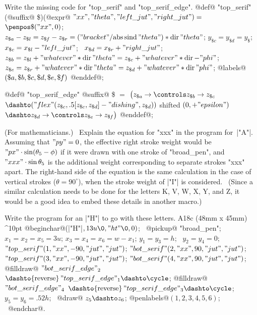 {{{{\ddangerexercise Write the missing code for "top\_serif" and
"top\_serif\_edge".
\answer @def@ "top\_serif"(@suffix@ \$)(@expr@ $"xx","theta",
 "left\_jut","right\_jut")=$\parbreak
\quad $\penpos\$("xx",0)$; \
$z_{\$a}-z_{\$l}=z_{\$\mkern-1muf}-z_{\$r}=
 ("bracket"/{\rm abs\,sind\,}"theta")\ast{\rm dir}\,"theta"$;\parbreak
\quad $y_{\$c}=y_{\$d}=y_\$$; \
 $x_{\$c}=x_{\$l}-"left\_jut"$; \ $x_{\$d}=x_{\$r}+"right\_jut"$;\parbreak
\quad $z_{\$b}=z_{\$l}+"whatever"\ast{\rm dir}\,"theta"
 =z_{\$c}+"whatever"\ast{\rm dir}\,{-"phi"}$;\parbreak
\quad $z_{\$e}=z_{\$r}+"whatever"\ast{\rm dir}\,"theta"
 =z_{\$d}+"whatever"\ast{\rm dir}\,"phi"$;\parbreak
\quad @labels@$(\$a,\$b,\$c,\$d,\$e,\$\mkern-1muf)$ @enddef@;\par
\smallskip\indent
@def@ "top\_serif\_edge" @suffix@ \$ $=$\parbreak
\quad $\bigl(z_{\$a}\to\controls z_{\$b}\to z_{\$c}$\parbreak
\qquad $\dashto("flex"(z_{\$c},.5[z_{\$c},z_{\$d}]-"dishing",
 z_{\$d}))$ shifted $(0,+"epsilon")$\parbreak
\qquad $\dashto z_{\$d}\to\controls z_{\$e}\to z_{\$\mkern-1muf}
 \bigr)$ @enddef@;

\ddangerexercise (For mathematicians.) \
Explain the equation for "xxx" in the program for~|"A"|.
\answer Assuming that $"py"=0$, the effective right stroke weight would be
$"px"\cdot\sin(\theta_5-\phi)$ if it were drawn with one stroke of "broad\_pen",
and $"xxx"\cdot\sin\theta_5$ is the additional weight corresponding to separate
strokes "xxx" apart. The right-hand side of the equation is the same
calculation in the case of vertical strokes ($\theta=90^\circ$), when the
stroke weight of |"I"| is considered. \ (Since a similar calculation
needs to be done for the letters K, V, W, X, Y, and Z, it would be a good
idea to embed these details in another macro.)

\ddangerexercise Write the program for an |"H"| to go with these letters.
\answer \rightfig A18c (48mm x 45mm) ^10pt
@beginchar@\kern1pt(|"H"|$,13u\0,"ht"\0,0)$; \ @pickup@ "broad\_pen";\parbreak
$x_1=x_2=x_5=3u$;\parbreak
$x_3=x_4=x_6=w-x_1$;\parbreak
$y_1=y_3=h$; \ $y_2=y_4=0$;\parbreak
$"top\_serif"(1,"xx",-90,"jut","jut")$;\parbreak
$"bot\_serif"(2,"xx",90,"jut","jut")$;\parbreak
$"top\_serif"(3,"xx",-90,"jut","jut")$;\parbreak
$"bot\_serif"(4,"xx",90,"jut","jut")$;\parbreak
@filldraw@ $"bot\_serif\_edge"_2$\parbreak
\quad$\dashto{\rm reverse}\,"top\_serif\_edge"_1\dashto\cycle$;\parbreak
@filldraw@ $"bot\_serif\_edge"_4$\parbreak
\quad$\dashto{\rm reverse}\,"top\_serif\_edge"_3\dashto\cycle$;\parbreak
$y_5=y_6=.52h$; \ @draw@ $z_5\dashto z_6$;\parbreak
@penlabels@$(1,2,3,4,5,6)$; \ @endchar@.

}}}}
